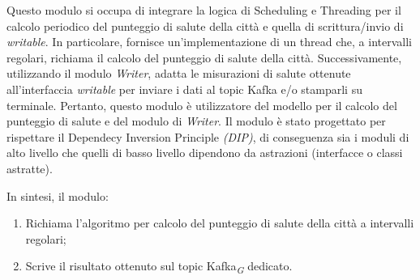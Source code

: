 Questo modulo si occupa di integrare la logica di Scheduling e Threading per il calcolo periodico del punteggio di salute della città e quella di scrittura/invio di \textit{writable}. In particolare, fornisce un'implementazione di un thread che, a intervalli regolari, richiama il calcolo del punteggio di salute della città. Successivamente, utilizzando il modulo \textit{Writer}, adatta le misurazioni di salute ottenute all'interfaccia \textit{writable} per inviare i dati al topic Kafka e/o stamparli su terminale. Pertanto, questo modulo è utilizzatore del modello per il calcolo del punteggio di salute e del modulo di \textit{Writer}.
Il modulo è stato progettato per rispettare il Dependecy Inversion Principle \textit{(DIP)}, di conseguenza sia i moduli di alto livello che quelli di basso livello dipendono da astrazioni (interfacce o classi astratte).

In sintesi, il modulo:
    \begin{enumerate}
        \item Richiama l'algoritmo per calcolo del punteggio di salute della città a intervalli regolari;
        \item Scrive il risultato ottenuto sul topic Kafka\textsubscript{\textit{G}} dedicato.
    \end{enumerate}

